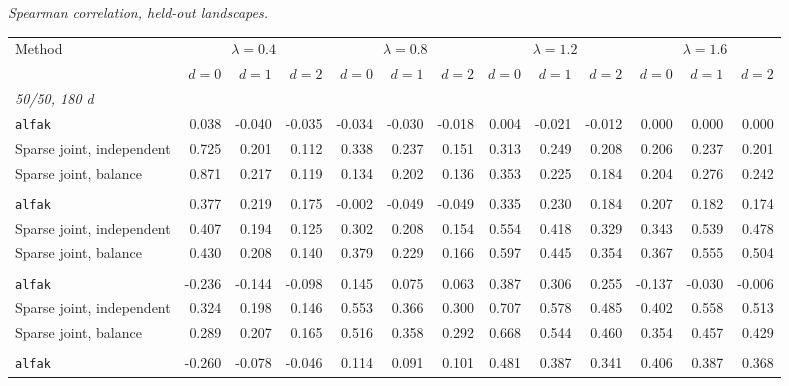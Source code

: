 \noindent\textit{Spearman correlation, held-out landscapes.}
\begin{center}
\scriptsize
\setlength{\tabcolsep}{2.5pt}
\begin{tabular}{l*{12}{r}}
\toprule
Method & \multicolumn{3}{c}{$\lambda=0.4$} & \multicolumn{3}{c}{$\lambda=0.8$} & \multicolumn{3}{c}{$\lambda=1.2$} & \multicolumn{3}{c}{$\lambda=1.6$} \\
\cmidrule(lr){2-4}\cmidrule(lr){5-7}\cmidrule(lr){8-10}\cmidrule(lr){11-13}
 & $d=0$ & $d=1$ & $d=2$ & $d=0$ & $d=1$ & $d=2$ & $d=0$ & $d=1$ & $d=2$ & $d=0$ & $d=1$ & $d=2$ \\
\midrule
\multicolumn{13}{l}{\textit{50/50, 180 d}} \\
\quad \texttt{alfak} & 0.038 & -0.040 & -0.035 & -0.034 & -0.030 & -0.018 & 0.004 & -0.021 & -0.012 & 0.000 & 0.000 & 0.000 \\
\quad Sparse joint, independent & 0.725 & 0.201 & 0.112 & 0.338 & 0.237 & 0.151 & 0.313 & 0.249 & 0.208 & 0.206 & 0.237 & 0.201 \\
\quad Sparse joint, balance & 0.871 & 0.217 & 0.119 & 0.134 & 0.202 & 0.136 & 0.353 & 0.225 & 0.184 & 0.204 & 0.276 & 0.242 \\
\addlinespace[2pt]
\multicolumn{13}{l}{\textit{200/200, 180 d}} \\
\quad \texttt{alfak} & 0.377 & 0.219 & 0.175 & -0.002 & -0.049 & -0.049 & 0.335 & 0.230 & 0.184 & 0.207 & 0.182 & 0.174 \\
\quad Sparse joint, independent & 0.407 & 0.194 & 0.125 & 0.302 & 0.208 & 0.154 & 0.554 & 0.418 & 0.329 & 0.343 & 0.539 & 0.478 \\
\quad Sparse joint, balance & 0.430 & 0.208 & 0.140 & 0.379 & 0.229 & 0.166 & 0.597 & 0.445 & 0.354 & 0.367 & 0.555 & 0.504 \\
\addlinespace[2pt]
\multicolumn{13}{l}{\textit{200/200, 360 d}} \\
\quad \texttt{alfak} & -0.236 & -0.144 & -0.098 & 0.145 & 0.075 & 0.063 & 0.387 & 0.306 & 0.255 & -0.137 & -0.030 & -0.006 \\
\quad Sparse joint, independent & 0.324 & 0.198 & 0.146 & 0.553 & 0.366 & 0.300 & 0.707 & 0.578 & 0.485 & 0.402 & 0.558 & 0.513 \\
\quad Sparse joint, balance & 0.289 & 0.207 & 0.165 & 0.516 & 0.358 & 0.292 & 0.668 & 0.544 & 0.460 & 0.354 & 0.457 & 0.429 \\
\addlinespace[2pt]
\multicolumn{13}{l}{\textit{500/700, 360 d}} \\
\quad \texttt{alfak} & -0.260 & -0.078 & -0.046 & 0.114 & 0.091 & 0.101 & 0.481 & 0.387 & 0.341 & 0.406 & 0.387 & 0.368 \\

\end{tabular}
\end{center}
